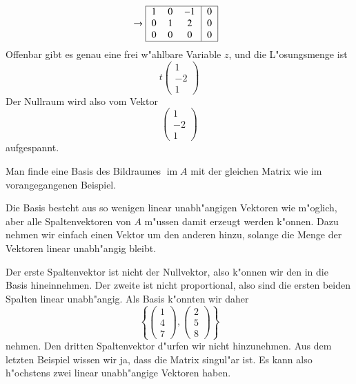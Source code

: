 \begin{beispiel}
\begin{align*}
&\rightarrow
\begin{tabular}{|>{$}c<{$}>{$}c<{$}>{$}c<{$}|>{$}c<{$}|}
\hline
 1& 0& -1&0\\
 0& 1&  2&0\\
 0& 0&  0&0\\
\hline
\end{tabular}
\end{align*}
Offenbar gibt es genau eine frei w"ahlbare Variable $z$, und
die L"osungsmenge ist 
\[
t\begin{pmatrix}
1\\-2\\1
\end{pmatrix}
\]
Der Nullraum wird also vom Vektor
\[
\begin{pmatrix}
1\\-2\\1
\end{pmatrix}
\]
aufgespannt.
\end{beispiel}

\begin{beispiel}
Man finde eine Basis des Bildraumes $\operatorname{im}A$ mit der gleichen
Matrix wie im vorangegangenen Beispiel. 

Die Basis besteht aus so wenigen linear unabh"angigen Vektoren wie
m"oglich, aber alle Spaltenvektoren von $A$ m"ussen damit erzeugt
werden k"onnen. Dazu nehmen wir einfach einen Vektor um den anderen
hinzu, solange die Menge der Vektoren linear unabh"angig bleibt.

Der erste Spaltenvektor ist nicht der Nullvektor, also k"onnen wir
den in die Basis hineinnehmen. Der zweite ist nicht proportional,
also sind die ersten beiden Spalten linear unabh"angig. Als
Basis k"onnten wir daher
\[
\left\{
\begin{pmatrix}1\\4\\7\end{pmatrix}
,
\begin{pmatrix}2\\5\\8\end{pmatrix}
\right\}
\]
nehmen. Den dritten Spaltenvektor d"urfen wir nicht hinzunehmen.
Aus dem letzten Beispiel wissen wir ja, dass die Matrix singul"ar
ist. Es kann also h"ochstens zwei linear unabh"angige Vektoren haben.
\end{beispiel}

